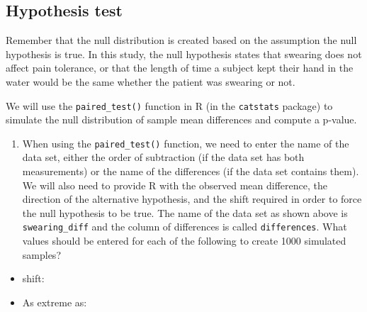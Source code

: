 \documentclass[
]{report}
\providecommand{\tightlist}{%
  \setlength{\itemsep}{0pt}\setlength{\parskip}{0pt}}
\begin{document}
\vspace{1in}

\subsection*{Hypothesis test}\label{hypothesis-test-1}

Remember that the null distribution is created based on the assumption the null hypothesis is true. In this study, the null hypothesis states that swearing does not affect pain tolerance, or that the length of time a subject kept their hand in the water would be the same whether the patient was swearing or not.

We will use the \texttt{paired\_test()} function in R (in the \texttt{catstats} package) to simulate the null distribution of sample mean differences and compute a p-value.

\newpage

\begin{enumerate}
\def\labelenumi{\arabic{enumi}.}
\setcounter{enumi}{8}
\tightlist
\item
  When using the \texttt{paired\_test()} function, we need to enter the name of the data set, either the order of subtraction (if the data set has both measurements) or the name of the differences (if the data set contains them). We will also need to provide R with the observed mean difference, the direction of the alternative hypothesis, and the shift required in order to force the null hypothesis to be true. The name of the data set as shown above is \texttt{swearing\_diff} and the column of differences is called \texttt{differences}. What values should be entered for each of the following to create 1000 simulated samples?
\end{enumerate}

\vspace{1mm}

\begin{itemize}
\tightlist
\item
  shift:
\end{itemize}

\vspace{.1in}

\begin{itemize}
\tightlist
\item
  As extreme as:
\end{itemize}

\vspace{.1in}
\end{document}
